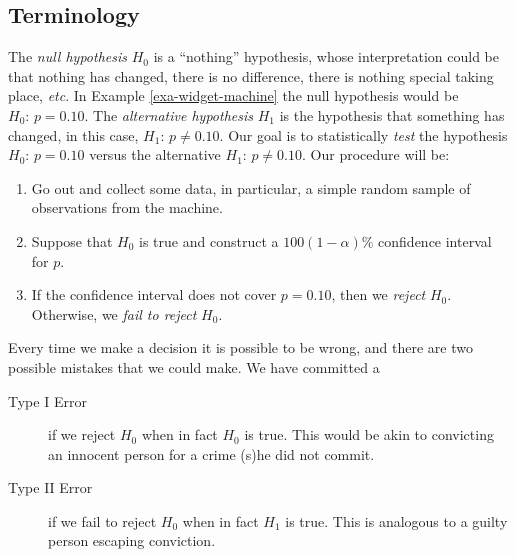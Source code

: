 \documentclass[captions=tableheading]{scrbook}
\begin{document}
\subsection{Terminology}
\label{sec-10-2-1}


The \emph{null hypothesis} \(H_{0}\) is a ``nothing'' hypothesis, whose interpretation could be that nothing has changed, there is no difference, there is nothing special taking place, \emph{etc}. In Example \ref{exa-widget-machine} the null hypothesis would be \(H_{0}:\, p=0.10.\) The \emph{alternative hypothesis} \(H_{1}\) is the hypothesis that something has changed, in this case, \(H_{1}:\, p\neq0.10\). Our goal is to statistically \emph{test} the hypothesis \(H_{0}:\, p=0.10\) versus the alternative \(H_{1}:\, p\neq0.10\). Our procedure will be:
\begin{enumerate}
\item Go out and collect some data, in particular, a simple random sample of observations from the machine.
\item Suppose that \(H_{0}\) is true and construct a \(100(1-\alpha)\%\) confidence interval for \(p\).
\item If the confidence interval does not cover \(p=0.10\), then we \emph{reject} \(H_{0}\). Otherwise, we \emph{fail to reject} \(H_{0}\).
\end{enumerate}

\begin{rem}
Every time we make a decision it is possible to be wrong, and there are two possible mistakes that we could make. We have committed a 
\begin{description}
\item[Type I Error] if we reject \(H_{0}\) when in fact \(H_{0}\) is true. This would be akin to convicting an innocent person for a crime (s)he did not commit.
\item[Type II Error] if we fail to reject \(H_{0}\) when in fact \(H_{1}\) is true. This is analogous to a guilty person escaping conviction.
\end{description}

\end{rem}
\end{document}
